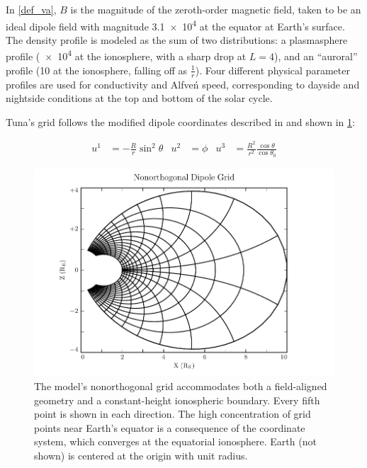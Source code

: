 \documentclass[draft,linenumbers]{agujournal}
\begin{document}
In \cref{def_va}, $B$ is the magnitude of the zeroth-order magnetic field, taken to be an ideal dipole field with magnitude \SI{3.1e4}{\nT} at the equator at Earth's surface. The density profile is modeled as the sum of two distributions: a plasmasphere profile (\SI{e4}{\percc} at the ionosphere, with a sharp drop at $L = 4$), and an ``auroral'' profile (\SI{10}{\percc} at the ionosphere, falling off as $\frac{1}{r}$). Four different physical parameter profiles are used for conductivity and Alfve\'n speed, corresponding to dayside and nightside conditions at the top and bottom of the solar cycle.


Tuna's grid follows the modified dipole coordinates described in \citet{lysak_2004} and shown in \cref{fig_grid}:
\begin{linenomath*}
\begin{align}
  \label{def_coords}
  u^1 & = - \frac{R}{r} \sin^2 \theta &
  u^2 & = \phi &
  u^3 & = \frac{R^2}{r^2} \frac{\cos \theta}{\cos \theta_0}
\end{align}
\end{linenomath*}

\begin{figure}
    \begin{center}
    \includegraphics[width=\textwidth]{figures/fig_grid.pdf}
    \caption{
        The model's nonorthogonal grid accommodates both a field-aligned geometry and a constant-height ionospheric boundary. Every fifth point is shown in each direction. The high concentration of grid points near Earth's equator is a consequence of the coordinate system, which converges at the equatorial ionosphere. Earth (not shown) is centered at the origin with unit radius.
    }
    \label{fig_grid}
    \end{center}
\end{figure}
\end{document}
